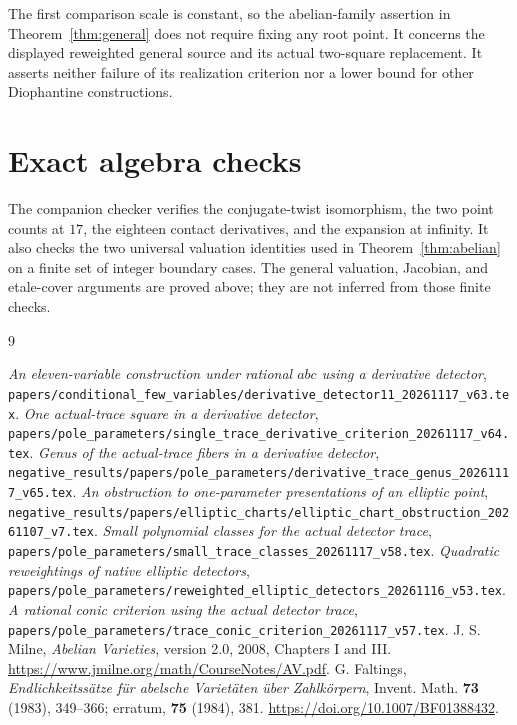 \documentclass[11pt,a4paper]{article}
\begin{document}
The first comparison scale is constant, so the abelian-family
assertion in Theorem~\ref{thm:general} does not require fixing
any root point. It concerns the displayed reweighted general
source and its actual two-square replacement. It asserts neither
failure of its realization criterion nor a lower bound for other
Diophantine constructions.

\section{Exact algebra checks}
The companion checker verifies the conjugate-twist isomorphism,
the two point counts at $17$, the eighteen contact derivatives,
and the expansion at infinity. It also checks the two universal
valuation identities used in Theorem~\ref{thm:abelian} on a
finite set of integer boundary cases. The general valuation,
Jacobian, and etale-cover arguments are proved above; they are
not inferred from those finite checks.

\begin{thebibliography}{9}\raggedright
{}\emph{An eleven-variable construction under rational
$abc$ using a derivative detector},
\nolinkurl{papers/conditional_few_variables/derivative_detector11_20261117_v63.tex}.
\emph{One actual-trace square in a derivative detector},
\nolinkurl{papers/pole_parameters/single_trace_derivative_criterion_20261117_v64.tex}.
\emph{Genus of the actual-trace fibers in a derivative detector},
\nolinkurl{negative_results/papers/pole_parameters/derivative_trace_genus_20261117_v65.tex}.
\emph{An obstruction to one-parameter presentations of an elliptic point},
\nolinkurl{negative_results/papers/elliptic_charts/elliptic_chart_obstruction_20261107_v7.tex}.
\emph{Small polynomial classes for the actual detector trace},
\nolinkurl{papers/pole_parameters/small_trace_classes_20261117_v58.tex}.
\emph{Quadratic reweightings of native elliptic detectors},
\nolinkurl{papers/pole_parameters/reweighted_elliptic_detectors_20261116_v53.tex}.
\emph{A rational conic criterion using the actual detector trace},
\nolinkurl{papers/pole_parameters/trace_conic_criterion_20261117_v57.tex}.
 J. S. Milne, \emph{Abelian Varieties}, version 2.0,
2008, Chapters I and III.\quad
\url{https://www.jmilne.org/math/CourseNotes/AV.pdf}.
 G. Faltings,
\emph{Endlichkeitss\"atze f\"ur abelsche Variet\"aten \"uber Zahlk\"orpern},
Invent. Math. \textbf{73} (1983), 349--366; erratum,
\textbf{75} (1984), 381.\quad
\url{https://doi.org/10.1007/BF01388432}.
\end{thebibliography}
\end{document}
